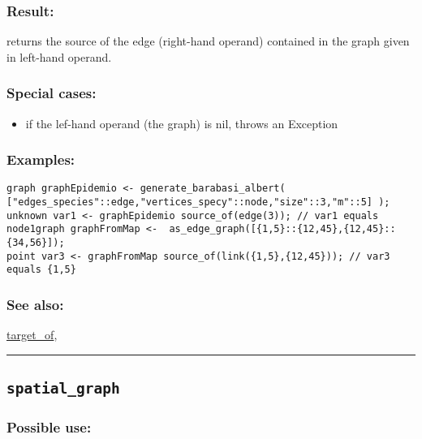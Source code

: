 \documentclass[]{book}
\providecommand{\tightlist}{%
  \setlength{\itemsep}{0pt}\setlength{\parskip}{0pt}}
\theoremstyle{definition}
\theoremstyle{definition}
\theoremstyle{definition}
\theoremstyle{remark}
\begin{document}
\subsubsection{Result:}\label{result-471}

returns the source of the edge (right-hand operand) contained in the
graph given in left-hand operand.

\subsubsection{Special cases:}\label{special-cases-125}

\begin{itemize}
\tightlist
\item
  if the lef-hand operand (the graph) is nil, throws an Exception
\end{itemize}

\subsubsection{Examples:}\label{examples-340}

\begin{verbatim}
graph graphEpidemio <- generate_barabasi_albert( ["edges_species"::edge,"vertices_specy"::node,"size"::3,"m"::5] );  
unknown var1 <- graphEpidemio source_of(edge(3)); // var1 equals node1graph graphFromMap <-  as_edge_graph([{1,5}::{12,45},{12,45}::{34,56}]);  
point var3 <- graphFromMap source_of(link({1,5},{12,45})); // var3 equals {1,5}
\end{verbatim}

\subsubsection{See also:}\label{see-also-189}

\href{OperatorsSZ\#target_of}{target\_of},

\begin{center}\rule{0.5\linewidth}{\linethickness}\end{center}

\subsection{\texorpdfstring{\texttt{spatial\_graph}}{spatial\_graph}}\label{spatial_graph}

\subsubsection{Possible use:}\label{possible-use-488}
\end{document}
